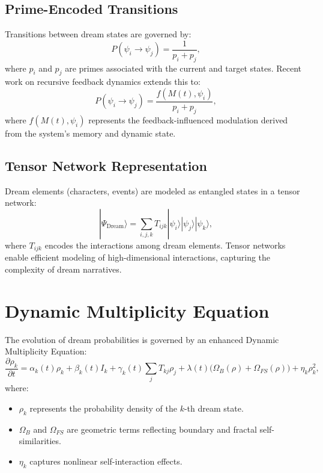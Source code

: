 \documentclass{article}
\theoremstyle{plain}
\begin{document}
\subsection{Prime-Encoded Transitions}
Transitions between dream states are governed by:
\begin{equation}
P(\psi_i \to \psi_j) = \frac{1}{p_i + p_j},
\end{equation}
where $p_i$ and $p_j$ are primes associated with the current and target states. Recent work on recursive feedback dynamics extends this to:
\begin{equation}
P(\psi_i \to \psi_j) = \frac{f(M(t), \psi_i)}{p_i + p_j},
\end{equation}
where $f(M(t), \psi_i)$ represents the feedback-influenced modulation derived from the system's memory and dynamic state.

\subsection{Tensor Network Representation}
Dream elements (characters, events) are modeled as entangled states in a tensor network:
\begin{equation}
|\Psi_{\text{Dream}}\rangle = \sum_{i,j,k} T_{ijk} |\psi_i\rangle |\psi_j\rangle |\psi_k\rangle,
\end{equation}
where $T_{ijk}$ encodes the interactions among dream elements. Tensor networks enable efficient modeling of high-dimensional interactions, capturing the complexity of dream narratives.

\section{Dynamic Multiplicity Equation}
The evolution of dream probabilities is governed by an enhanced Dynamic Multiplicity Equation:
\begin{equation}
\frac{\partial \rho_k}{\partial t} = \alpha_k(t) \rho_k + \beta_k(t) I_k + \gamma_k(t) \sum_{j} T_{kj} \rho_j + \lambda(t) \big(\Omega_B(\rho) + \Omega_{FS}(\rho)\big) + \eta_k \rho_k^2,
\end{equation}
where:
\begin{itemize}
    \item $\rho_k$ represents the probability density of the $k$-th dream state.
    \item $\Omega_B$ and $\Omega_{FS}$ are geometric terms reflecting boundary and fractal self-similarities.
    \item $\eta_k$ captures nonlinear self-interaction effects.
\end{itemize}
\end{document}
